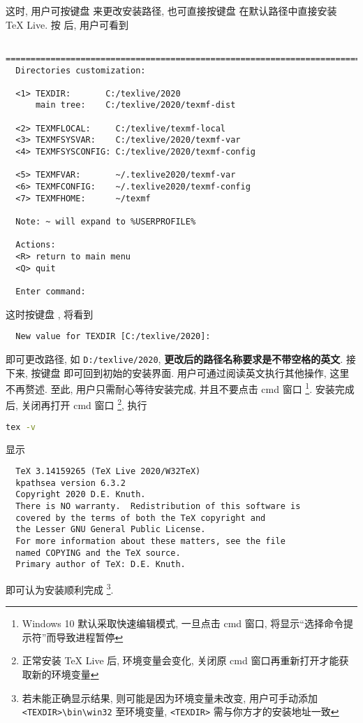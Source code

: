 这时, 用户可按键盘  来更改安装路径,
也可直接按键盘  在默认路径中直接安装 \TeX{} Live. 
按  后, 用户可看到
\begin{lstlisting}
  ==============================================================================
  Directories customization:
  
  <1> TEXDIR:       C:/texlive/2020
      main tree:    C:/texlive/2020/texmf-dist
  
  <2> TEXMFLOCAL:     C:/texlive/texmf-local
  <3> TEXMFSYSVAR:    C:/texlive/2020/texmf-var
  <4> TEXMFSYSCONFIG: C:/texlive/2020/texmf-config
  
  <5> TEXMFVAR:       ~/.texlive2020/texmf-var
  <6> TEXMFCONFIG:    ~/.texlive2020/texmf-config
  <7> TEXMFHOME:      ~/texmf
  
  Note: ~ will expand to %USERPROFILE%
  
  Actions:
  <R> return to main menu
  <Q> quit
  
  Enter command:
\end{lstlisting}
这时按键盘 , 将看到
\begin{lstlisting}
  New value for TEXDIR [C:/texlive/2020]:
\end{lstlisting}
即可更改路径, 如 \texttt{D:/texlive/2020},
\textbf{更改后的路径名称要求是不带空格的英文}.
接下来, 按键盘  即可回到初始的安装界面. 
用户可通过阅读英文执行其他操作, 这里不再赘述. 
至此, 用户只需耐心等待安装完成, 并且不要点击 \textsf{cmd} 窗口%
\footnote{Windows 10 默认采取快速编辑模式, 一旦点击 \textsf{cmd} 窗口,
将显示``选择命令提示符''而导致进程暂停}. 
安装完成后, 关闭再打开 \textsf{cmd} 窗口%
\footnote{正常安装 \TeX{} Live 后, 环境变量会变化,
关闭原 \textsf{cmd} 窗口再重新打开才能获取新的环境变量},
执行
\begin{lstlisting}[language = bash]
  tex -v
\end{lstlisting}
显示
\begin{lstlisting}
  TeX 3.14159265 (TeX Live 2020/W32TeX)
  kpathsea version 6.3.2
  Copyright 2020 D.E. Knuth.
  There is NO warranty.  Redistribution of this software is
  covered by the terms of both the TeX copyright and
  the Lesser GNU General Public License.
  For more information about these matters, see the file
  named COPYING and the TeX source.
  Primary author of TeX: D.E. Knuth.
\end{lstlisting}
即可认为安装顺利完成%
\footnote{若未能正确显示结果, 则可能是因为环境变量未改变,
用户可手动添加 \texttt{<TEXDIR>\textbackslash bin\textbackslash win32} 至环境变量,
\texttt{<TEXDIR>} 需与你方才的安装地址一致}. 

